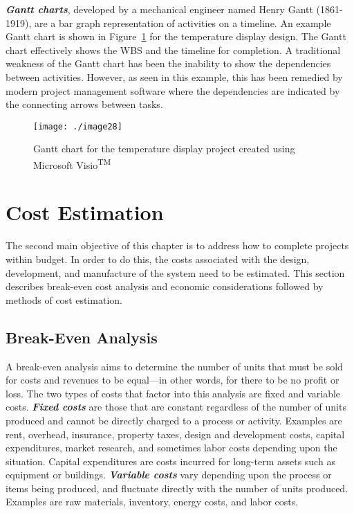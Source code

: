 \emph{\textbf{Gantt charts}}, developed by a mechanical engineer named
Henry Gantt (1861-1919), are a bar graph representation of activities on
a timeline. An example Gantt chart is shown in Figure~\ref{figure:ghantChart} for the
temperature display design. The Gantt chart effectively shows the WBS
and the timeline for completion. A traditional weakness of the Gantt
chart has been the inability to show the dependencies between
activities. However, as seen in this example, this has been remedied by
modern project management software where the dependencies are indicated
by the connecting arrows between tasks.

\begin{figure}[h]
\texttt{[image: ./image28]}
\caption{Gantt chart for the temperature display project
created using Microsoft Visio\textsuperscript{TM}}
\label{figure:ghantChart}
\end{figure}


\section{Cost Estimation}
\label{section:cost-estimation}

The second main objective of this chapter is to address how to complete
projects within budget. In order to do this, the costs associated with
the design, development, and manufacture of the system need to be
estimated. This section describes break-even cost analysis and economic
considerations followed by methods of cost estimation.

\subsection{Break-Even Analysis}
\label{subsection:break-even-analysis}

A break-even analysis aims to determine the number of units that must be
sold for costs and revenues to be equal---in other words, for there to
be no profit or loss. The two types of costs that factor into this
analysis are fixed and variable costs. \emph{\textbf{Fixed costs}} are
those that are constant regardless of the number of units produced and
cannot be directly charged to a process or activity. Examples are rent,
overhead, insurance, property taxes, design and development costs,
capital expenditures, market research, and sometimes labor costs
depending upon the situation. Capital expenditures are costs incurred
for long-term assets such as equipment or buildings.
\emph{\textbf{Variable costs}} vary depending upon the process or items
being produced, and fluctuate directly with the number of units
produced. Examples are raw materials, inventory, energy costs, and labor
costs.

